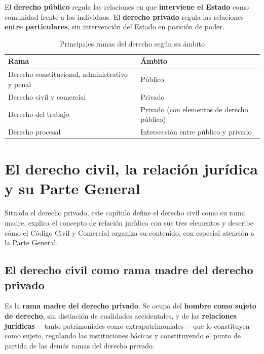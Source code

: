 \documentclass[12pt,oneside]{book}
\begin{document}
\begin{definicion}
El \textbf{derecho público} regula las relaciones en que \textbf{interviene el Estado} como comunidad frente a los individuos. El \textbf{derecho privado} regula las relaciones \textbf{entre particulares}, sin intervención del Estado en posición de poder.
\end{definicion}

\begin{table}[H]
\centering
\begin{tabularx}{\textwidth}{B{0.38\textwidth} Y}
\toprule
\textbf{Rama} & \textbf{Ámbito} \\
\midrule
Derecho constitucional, administrativo y penal & Público \\
Derecho civil y comercial & Privado \\
Derecho del trabajo & Privado (con elementos de derecho público) \\
Derecho procesal & Intersección entre público y privado \\
\bottomrule
\end{tabularx}
\caption{Principales ramas del derecho según su ámbito}
\end{table}

\chapter{El derecho civil, la relación jurídica y su Parte General}
\label{cap:civil}

Situado el derecho privado, este capítulo define el derecho civil como su rama madre, explica el concepto de relación jurídica con sus tres elementos y describe cómo el Código Civil y Comercial organiza su contenido, con especial atención a la Parte General.

\section{El derecho civil como rama madre del derecho privado}

\begin{definicion}
Es la \textbf{rama madre del derecho privado}. Se ocupa del \textbf{hombre como sujeto de derecho}, sin distinción de cualidades accidentales, y de las \textbf{relaciones jurídicas} ---tanto patrimoniales como extrapatrimoniales--- que lo constituyen como sujeto, regulando las instituciones básicas y constituyendo el punto de partida de las demás ramas del derecho privado.
\end{definicion}
\end{document}
